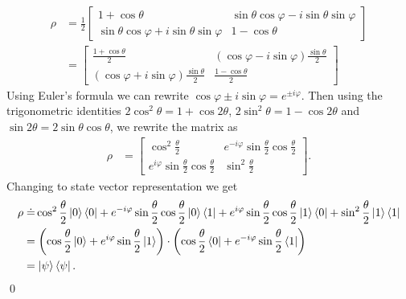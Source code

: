 {\everymath{\displaystyle}
\begin{align}
    \rho &= \frac{1}{2} 
    \begin{bmatrix}
        1 + \cos\theta & \sin\theta  \cos\varphi - i \sin\theta \sin\varphi\\
        \sin\theta  \cos\varphi + i \sin\theta \sin\varphi & 1 - \cos\theta
    \end{bmatrix}\\
    &= 
    \begin{bmatrix}
        \frac{1 + \cos\theta}{2} & (\cos\varphi - i\sin\varphi)\frac{\sin\theta}{2}\\[8pt]
    (\cos\varphi + i\sin\varphi)\frac{\sin\theta}{2} &  \frac{1 - \cos\theta}{2}
    \end{bmatrix}
\end{align}
Using Euler's formula we can rewrite $\cos\varphi \pm i\sin\varphi = e^{\pm i \varphi}$. Then using the trigonometric identities $2\cos^2\theta = 1 + \cos 2\theta$, $2 \sin^2\theta = 1 - \cos 2\theta$ and $\sin 2\theta = 2\sin\theta \cos\theta$, we rewrite the matrix as
\begin{align}
    \rho &= 
    \begin{bmatrix}
        \cos^2\frac{\theta}{2} & e^{-i\varphi}\sin\frac{\theta}{2}\cos\frac{\theta}{2}\\[8pt]
        e^{i\varphi}\sin\frac{\theta}{2}\cos\frac{\theta}{2} & \sin^2\frac{\theta}{2}
    \end{bmatrix}.
\end{align}
Changing to state vector representation we get
\begin{align}
    \rho &\;\dot{=} \cos^2\frac{\theta}{2} \ket{0}\bra{0} + e^{-i\varphi}\sin\frac{\theta}{2}\cos\frac{\theta}{2} \ket{0}\bra{1} + e^{i\varphi}\sin\frac{\theta}{2}\cos\frac{\theta}{2}\ket{1}\bra{0} + \sin^2\frac{\theta}{2} \ket{1}\bra{1}\\
    &= \left(\cos\frac{\theta}{2} \ket{0} + e^{i\varphi}\sin\frac{\theta}{2}\ket{1}\right) \cdot \left(\cos\frac{\theta}{2} \bra{0} + e^{-i\varphi}\sin\frac{\theta}{2}\bra{1}\right) \\
    &= \ket{\psi} \bra{\psi}.
\end{align}}
\qed
